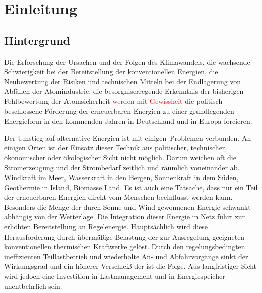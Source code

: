 \chapter{Einleitung}
\label{chap:einleitung}

%

\section{Hintergrund}
Die Erforschung der Ursachen und der Folgen des Klimawandels, die wachsende Schwierigkeit bei der Bereitstellung der
konventionellen Energien, die Neubewertung der Risiken und technischen Mitteln bei der Endlagerung von Abfällen der
Atomindustrie, die besorgniserregende Erkenntnis der bisherigen Fehlbewertung der Atomsicherheit \textcolor{red}{werden mit
Gewissheit} die politisch beschlossene Förderung der erneuerbaren Energien zu einer grundlegenden Energieform in den
kommenden Jahren in Deutschland und in Europa forcieren.

Der Umstieg auf alternative Energien ist mit einigen$\,$ Problemen verbunden. An einigen Orten ist
der Einsatz dieser Technik aus politischer, technischer, ökonomischer oder ökologischer Sicht nicht möglich. Darum weichen
oft die Stromerzeugung und der Strombedarf zeitlich und räumlich voneinander ab. Windkraft im Meer, Wasserkraft in den
Bergen, Sonnenkraft in dem Süden, Geothermie in Island, Biomasse Land. Es ist auch
eine Tatsache, dass nur ein Teil der erneuerbaren Energien direkt vom Menschen beeinflusst werden kann. Besonders die Menge
der durch Sonne und Wind gewonnenen Energie schwankt abhängig von der Wetterlage. Die Integration dieser Energie in Netz
führt zur erhöhten Bereitstellung an Regelenergie. Hauptsächlich wird diese Herausforderung durch übermäßige Belastung der zur
Ausregelung geeigneten konventionellen thermischen Kraftwerke gelöst. Durch den regelungsbedingten ineffizienten
Teillastbetrieb und wiederholte An- und Abfahrvorgänge sinkt der Wirkungsgrad und ein höherer Verschleiß der ist die Folge.
Aus langfristiger Sicht wird jedoch eine Investition in Lastmanagement und in Energiespeicher unentbehrlich sein.
